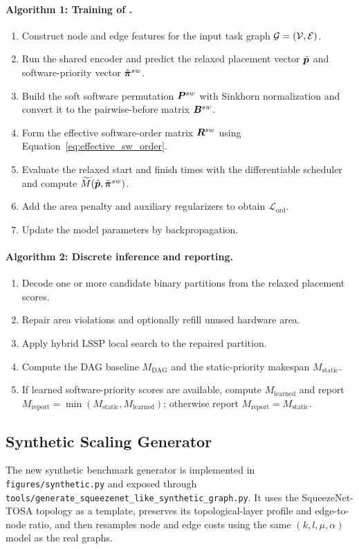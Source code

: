 \paragraph{Algorithm 1: Training of \diffgnnorder.}
\begin{enumerate}
\item Construct node and edge features for the input task graph $\mathcal{G}=(\mathcal{V},\mathcal{E})$.
\item Run the shared encoder and predict the relaxed placement vector $\tilde{\bm{p}}$ and software-priority vector $\tilde{\bm{\pi}}^{sw}$.
\item Build the soft software permutation $\bm{P}^{sw}$ with Sinkhorn normalization and convert it to the pairwise-before matrix $\bm{B}^{sw}$.
\item Form the effective software-order matrix $\bm{R}^{sw}$ using Equation~\eqref{eq:effective_sw_order}.
\item Evaluate the relaxed start and finish times with the differentiable scheduler and compute $\widetilde{M}(\tilde{\bm{p}},\tilde{\bm{\pi}}^{sw})$.
\item Add the area penalty and auxiliary regularizers to obtain $\mathcal{L}_{\mathrm{ord}}$.
\item Update the model parameters by backpropagation.
\end{enumerate}

\paragraph{Algorithm 2: Discrete inference and reporting.}
\begin{enumerate}
\item Decode one or more candidate binary partitions from the relaxed placement scores.
\item Repair area violations and optionally refill unused hardware area.
\item Apply hybrid LSSP local search to the repaired partition.
\item Compute the DAG baseline $M_{\mathrm{DAG}}$ and the static-priority makespan $M_{\mathrm{static}}$.
\item If learned software-priority scores are available, compute $M_{\mathrm{learned}}$ and report $M_{\mathrm{report}}=\min(M_{\mathrm{static}},M_{\mathrm{learned}})$; otherwise report $M_{\mathrm{report}}=M_{\mathrm{static}}$.
\end{enumerate}

\subsection{Synthetic Scaling Generator}
The new synthetic benchmark generator is implemented in \texttt{figures/synthetic.py} and exposed through \texttt{tools/generate\_squeezenet\_like\_synthetic\_graph.py}. It uses the SqueezeNet-TOSA topology as a template, preserves its topological-layer profile and edge-to-node ratio, and then resamples node and edge costs using the same $(k,l,\mu,\alpha)$ model as the real graphs.
